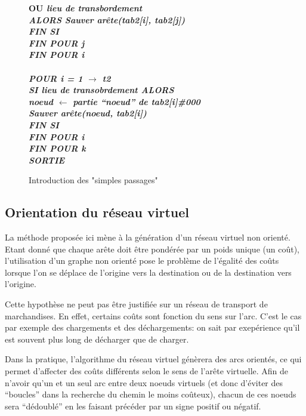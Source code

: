 \begin{center}
\begin{figure}[htbp]
{\begin{minipage}{20cm}
\begin{tabbing}
\> \> \> \bf{OU} \it{lieu de transbordement}\\
\> \> \> \> \> \bf{ALORS} \it {Sauver arête(tab2[i], tab2[j])}\\
\> \> \> \bf{FIN SI}\\
\> \> \bf{FIN POUR} j\\
\> \bf {FIN POUR} i\\
\\
\> \bf{POUR} i = 1 $\rightarrow$ t2\\
\> \> \bf{SI} \it{lieu de transobrdement} \bf{ALORS}\\
\> \> \> noeud $\leftarrow$ \it{partie ``noeud'' de tab2[i]\#000}\\
\> \> \> \it{Sauver arête(noeud, tab2[i])}\\
\> \> \bf{FIN SI}\\
\> \bf{FIN POUR} i\\
\bf {FIN POUR} k\\
\bf {SORTIE}\\
\end{tabbing}
\end{minipage}
}
\caption{\label{algo3} Introduction des "simples passages"}
\end{figure}
\end{center}

\subsection{Orientation du r\'eseau virtuel}

La méthode proposée ici mène à la génération d'un réseau virtuel
non orienté. Etant donné que chaque arête doit être pondérée par un
poids unique (un coût), l'utilisation d'un graphe non orienté pose
le problème de l'égalité des coûts lorsque l'on se déplace de
l'origine vers la destination ou de la destination vers l'origine.

Cette hypothèse ne peut pas être justifiée sur un réseau de transport de
marchan\-di\-ses. En effet, certains coûts sont fonction du sens sur l'arc.
C'est le cas par exemple des chargements et des déchargements: on sait par
exepérience qu'il est souvent plus long de décharger que de charger.

Dans la pratique, l'algorithme du réseau virtuel génèrera des arcs
orientés, ce qui permet d'affecter des coûts différents selon le
sens de l'arête virtuelle. Afin de n'avoir qu'un et un seul arc entre deux noeuds virtuels (et donc d'éviter des ``boucles'' dans la recherche du chemin le moins coûteux), chacun de ces noeuds sera ``dédoublé'' en les faisant précéder par un signe positif ou négatif. 

